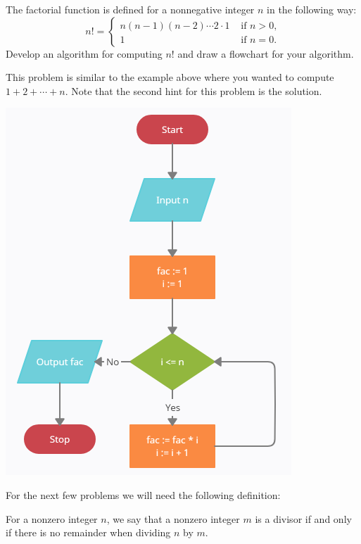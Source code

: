 \documentclass{ximera}
\begin{document}
\begin{question}
	The factorial function is defined for a nonnegative integer $n$ in the following way:
	$$n! = \begin{cases}n(n-1)(n-2)\cdots 2\cdot 1 & \text{ if $n>0$,}\\
		1 & \text{ if $n=0$.}
	\end{cases}$$
	Develop an algorithm for computing $n!$ and draw a flowchart for your algorithm.
	\begin{hint}
		This problem is similar to the example above where you wanted to compute $1+2+\cdots+n$. Note that the second hint for this problem is the solution.
	\end{hint}
	\begin{hint}
		\begin{center}
			\includegraphics{factorial.png}
		\end{center}
	\end{hint}
\end{question}

For the next few problems we will need the following definition:

\begin{definition}
	For a nonzero integer $n$, we say that a nonzero integer $m$ is a divisor if and only if there is no remainder when dividing $n$ by $m$.
\end{definition}
\end{document}
